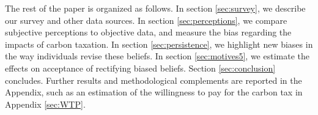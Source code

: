 \documentclass[11pt]{article}
\begin{document}

The rest of the paper is organized as follows. In section \ref{sec:survey}, we describe our survey and other data sources. In section \ref{sec:perceptions}, we compare subjective perceptions to objective data, and measure the bias regarding the impacts of carbon taxation. In section \ref{sec:persistence}, we highlight new biases in the way individuals revise these beliefs. In section \ref{sec:motives5}, we estimate the effects on acceptance of rectifying biased beliefs. Section \ref{sec:conclusion} concludes. Further results and methodological complements are reported in the Appendix, such as an estimation of the willingness to pay for the carbon tax in Appendix \ref{sec:WTP}.


\end{document}
